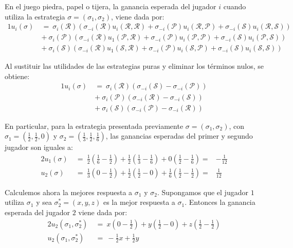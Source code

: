 En el juego piedra, papel o tijera, la ganancia esperada del jugador $i$ cuando utiliza la estrategia $\sigma = (\sigma_1, \sigma_2)$, viene dada por:
\begin{alignat}{1}
	u_i(\sigma)\ &=\ \sigma_i(\mathcal{R}) \left( \sigma_{-i}(\mathcal{R}) u_i(\mathcal{R}, \mathcal{R}) + \sigma_{-i}(\mathcal{P}) u_i(\mathcal{R}, \mathcal{P})+ \sigma_{-i}(\mathcal{S}) u_i(\mathcal{R}, \mathcal{S}) \right) \\
    &+\ \sigma_i(\mathcal{P}) \left(\sigma_{-i}(\mathcal{R}) u_1(\mathcal{P}, \mathcal{R}) + \sigma_{-i}(\mathcal{P}) u_i(\mathcal{P}, \mathcal{P})+ \sigma_{-i}(\mathcal{S}) u_i(\mathcal{P}, \mathcal{S})\right) \\
	&+\ \sigma_i(\mathcal{S}) \left(  \sigma_{-i}(\mathcal{R})  u_1(\mathcal{S}, \mathcal{R}) + \sigma_{-i}(\mathcal{P}) u_i(\mathcal{S}, \mathcal{P})+ \sigma_{-i}(\mathcal{S}) u_i(\mathcal{S}, \mathcal{S})\right)
\end{alignat}

Al sustituir las utilidades de las estrategias puras y eliminar los términos nulos, se obtiene:
\begin{alignat}{1}
	u_i(\sigma)\
	&=\ \sigma_i(\mathcal{R}) \left(\sigma_{-i}(\mathcal{S}) - \sigma_{-i}(\mathcal{P}) \right) \\ \nonumber
    &+\ \sigma_i(\mathcal{P}) \left(\sigma_{-i}(\mathcal{R}) - \sigma_{-i}(\mathcal{S}) \right) \\ \nonumber
	&+\ \sigma_i(\mathcal{S}) \left(\sigma_{-i}(\mathcal{P}) - \sigma_{-i}(\mathcal{R}) \right)
\end{alignat}

En particular, para la estrategia presentada previamente $\sigma = (\sigma_1, \sigma_2)$, con $\sigma_1 = \left( \frac{1}{2}, \frac{1}{2}, 0 \right)$ y $\sigma_2 = \left(\frac{1}{3}, \frac{1}{2}, \frac{1}{6} \right)$, las ganancias esperadas del primer y segundo jugador son iguales a:
\begin{alignat}{2}
    u_1(\sigma)\ &=\ \frac{1}{2} \left(\frac{1}{6} - \frac{1}{2}\right) + \frac{1}{2} \left( \frac{1}{3} -\frac{1}{6} \right) + 0 \left( \frac{1}{2} - \frac{1}{6} \right) =& -\frac{1}{12} \\
    u_2(\sigma)\ &=\ \frac{1}{3}\left(0 -\frac{1}{2} \right) + \frac{1}{2} \left( \frac{1}{2} - 0 \right) + \frac{1}{6} \left( \frac{1}{2} - \frac{1}{2} \right) =& \frac{1}{12}
\end{alignat}

Calculemos ahora la mejores respuesta a $\sigma_1$ y $\sigma_2$. Supongamos que el jugador $1$ utiliza $\sigma_1$ y sea $\sigma^*_2 = (x, y, z)$ es la mejor respuesta a $\sigma_1$. Entonces la ganancia esperada del jugador $2$ viene dada por:
\begin{alignat}{2}
u_2(\sigma_1, \sigma^*_2)\ &=\ x\left(0 -\frac{1}{2}\right) + y\left(\frac{1}{2} - 0\right) + z\left(\frac{1}{2} - \frac{1}{2}\right) \\
u_2(\sigma_1, \sigma^*_2)\ &=\ -\frac{1}{2}x + \frac{1}{2}y
\end{alignat}


